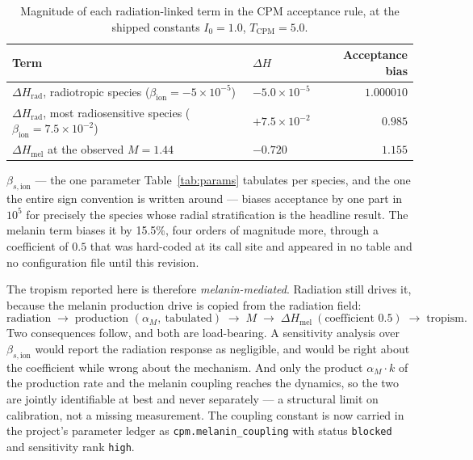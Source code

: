 \documentclass[11pt]{article}
\begin{document}
\begin{table}[h!]
\centering
\small
\caption{Magnitude of each radiation-linked term in the CPM acceptance rule, at the shipped
constants $I_0 = 1.0$, $T_{\mathrm{CPM}} = 5.0$.}
\label{tab:term_magnitudes}
\begin{tabular}{@{}llr@{}}
\toprule
\textbf{Term} & $\Delta H$ & \textbf{Acceptance bias} \\
\midrule
$\Delta H_{\mathrm{rad}}$, radiotropic species ($\beta_{\mathrm{ion}} = -5\times10^{-5}$) & $-5.0\times10^{-5}$ & $1.000010$ \\
$\Delta H_{\mathrm{rad}}$, most radiosensitive species ($\beta_{\mathrm{ion}} = 7.5\times10^{-2}$) & $+7.5\times10^{-2}$ & $0.985$ \\
$\Delta H_{\mathrm{mel}}$ at the observed $M = 1.44$ & $-0.720$ & $\mathbf{1.155}$ \\
\bottomrule
\end{tabular}
\end{table}

$\beta_{s,\mathrm{ion}}$ --- the one parameter Table~\ref{tab:params} tabulates per species, and
the one the entire sign convention is written around --- biases acceptance by one part in $10^5$
for precisely the species whose radial stratification is the headline result. The melanin term
biases it by 15.5\%, four orders of magnitude more, through a coefficient of $0.5$ that was
hard-coded at its call site and appeared in no table and no configuration file until this revision.

The tropism reported here is therefore \emph{melanin-mediated}. Radiation still drives it, because
the melanin production drive is copied from the radiation field:
\[
\text{radiation} \;\rightarrow\; \text{production } (\alpha_M,\ \text{tabulated})
\;\rightarrow\; M \;\rightarrow\; \Delta H_{\mathrm{mel}}\ (\text{coefficient } 0.5)
\;\rightarrow\; \text{tropism}.
\]
Two consequences follow, and both are load-bearing. A sensitivity analysis over
$\beta_{s,\mathrm{ion}}$ would report the radiation response as negligible, and would be right
about the coefficient while wrong about the mechanism. And only the product $\alpha_M \cdot k$ of
the production rate and the melanin coupling reaches the dynamics, so the two are jointly
identifiable at best and never separately --- a structural limit on calibration, not a missing
measurement. The coupling constant is now carried in the project's parameter ledger as
\texttt{cpm.melanin\_coupling} with status \texttt{blocked} and sensitivity rank \texttt{high}.
\end{document}
